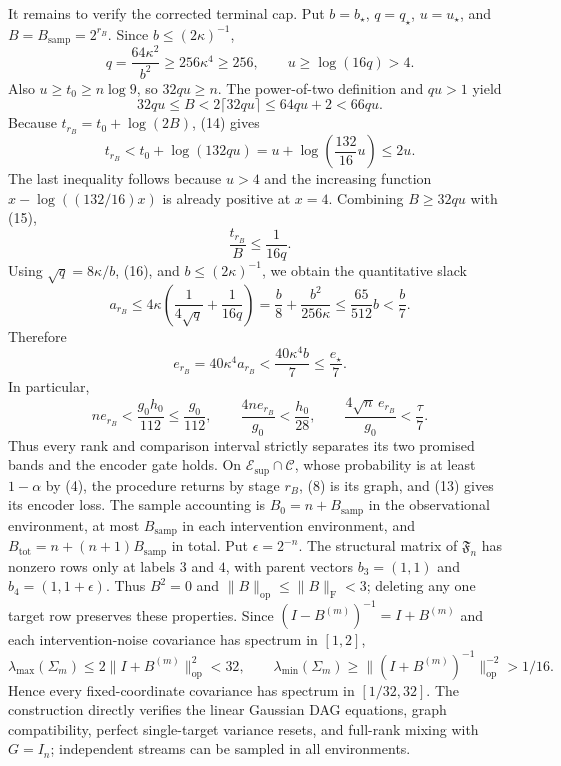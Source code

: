 It remains to verify the corrected terminal cap.  Put \(b=b_{\star}\), \(q=q_{\star}\), \(u=u_{\star}\), and \(B=B_{\mathrm{samp}}=2^{r_B}\).  Since \(b\le(2\kappa)^{-1}\),
\[
 q=\frac{64\kappa^2}{b^2}\ge256\kappa^4\ge256,
 \qquad u\ge\log(16q)>4.
\]
Also \(u\ge t_0\ge n\log9\), so \(32qu\ge n\).  The power-of-two definition and \(qu>1\) yield
\[
 32qu\le B<2\lceil32qu\rceil\le64qu+2<66qu.
 \tag{14}
\]
Because \(t_{r_B}=t_0+\log(2B)\), (14) gives
\[
 t_{r_B}<t_0+\log(132qu)
 =u+\log\!\left(\frac{132}{16}u\right)\le2u.
 \tag{15}
\]
The last inequality follows because \(u>4\) and the increasing function \(x-\log((132/16)x)\) is already positive at \(x=4\).  Combining \(B\ge32qu\) with (15),
\[
 \frac{t_{r_B}}{B}\le\frac1{16q}.
 \tag{16}
\]
Using \(\sqrt q=8\kappa/b\), (16), and \(b\le(2\kappa)^{-1}\), we obtain the quantitative slack
\[
 a_{r_B}
 \le4\kappa\left(\frac1{4\sqrt q}+\frac1{16q}\right)
 =\frac b8+\frac{b^2}{256\kappa}
 \le\frac{65}{512}b<\frac b7.
 \tag{17}
\]
Therefore
\[
 e_{r_B}=40\kappa^4a_{r_B}<\frac{40\kappa^4b}{7}
 \le\frac{e_{\star}}7.
 \tag{18}
\]
In particular,
\[
 ne_{r_B}<\frac{g_0h_0}{112}\le\frac{g_0}{112},
 \qquad
 \frac{4ne_{r_B}}{g_0}<\frac{h_0}{28},
 \qquad
 \frac{4\sqrt n\,e_{r_B}}{g_0}<\frac{\tau}{7}.
 \tag{19}
\]
Thus every rank and comparison interval strictly separates its two promised bands and the encoder gate holds.  On \(\mathcal E_{\mathrm{sup}}\cap\mathcal C\), whose probability is at least \(1-\alpha\) by (4), the procedure returns by stage \(r_B\), (8) is its graph, and (13) gives its encoder loss.  The sample accounting is \(B_0=n+B_{\mathrm{samp}}\) in the observational environment, at most \(B_{\mathrm{samp}}\) in each intervention environment, and \(B_{\mathrm{tot}}=n+(n+1)B_{\mathrm{samp}}\) in total.
Put \(\epsilon=2^{-n}\).  The structural matrix of \(\mathfrak F_n\) has nonzero rows only at labels \(3\) and \(4\), with parent vectors \(b_3=(1,1)\) and \(b_4=(1,1+\epsilon)\).  Thus \(B^2=0\) and \(\|B\|_{\mathrm{op}}\le\|B\|_{\mathrm F}<3\); deleting any one target row preserves these properties.  Since \((I-B^{(m)})^{-1}=I+B^{(m)}\) and each intervention-noise covariance has spectrum in \([1,2]\),
\[
 \lambda_{\max}(\Sigma_m)
 \le2\|I+B^{(m)}\|_{\mathrm{op}}^2<32,
 \qquad
 \lambda_{\min}(\Sigma_m)
 \ge\|(I+B^{(m)})^{-1}\|_{\mathrm{op}}^{-2}>1/16.
 \tag{20}
\]
Hence every fixed-coordinate covariance has spectrum in \([1/32,32]\).  The construction directly verifies the linear Gaussian DAG equations, graph compatibility, perfect single-target variance resets, and full-rank mixing with \(G=I_n\); independent streams can be sampled in all environments.

